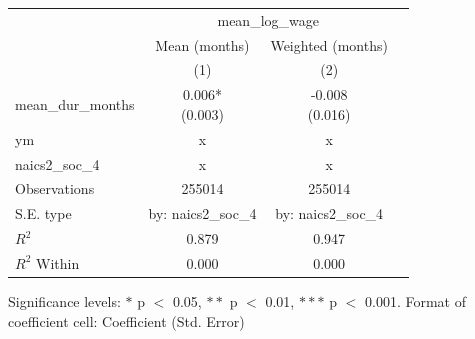\renewcommand\cellalign{t}
\begin{threeparttable}
\begin{tabular}{lccc}
\toprule
 & \multicolumn{2}{c}{mean_log_wage} \\
\cmidrule(lr){2-3} 
 & Mean (months) & Weighted (months) \\
 & (1) & (2) \\
\midrule
\addlinespace
mean_dur_months & \makecell{0.006* \\ (0.003)} & \makecell{-0.008 \\ (0.016)} \\
\midrule
\addlinespace
ym & x & x \\
naics2_soc_4 & x & x \\
\midrule
\addlinespace
Observations & 255014 & 255014 \\
S.E. type & by: naics2_soc_4 & by: naics2_soc_4 \\
$R^2$ & 0.879 & 0.947 \\
$R^2$ Within & 0.000 & 0.000 \\
\bottomrule
\end{tabular}
\footnotesize Significance levels: $*$ p $<$ 0.05, $**$ p $<$ 0.01, $***$ p $<$ 0.001. Format of coefficient cell: Coefficient 
 (Std. Error)
\end{threeparttable}